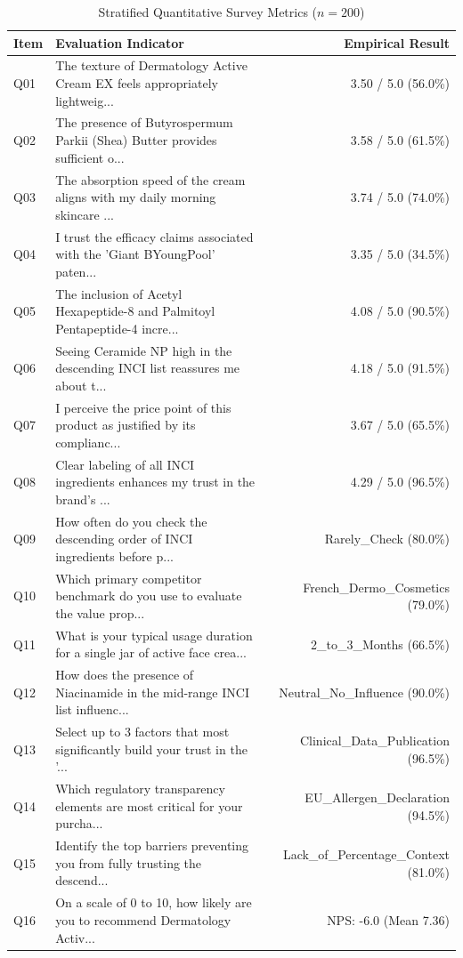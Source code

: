 \documentclass[10pt,twocolumn,a4paper]{article}
\begin{document}
\begin{table}[t]
\centering
\caption{Stratified Quantitative Survey Metrics ($n = 200$)}
\label{tab:metrics}
\small
\begin{tabularx}{\textwidth}{l X r}
\toprule
\textbf{Item} & \textbf{Evaluation Indicator} & \textbf{Empirical Result} \\
\midrule
Q01 & The texture of Dermatology Active Cream EX feels appropriately lightweig... & 3.50 / 5.0 (56.0\%) \\
Q02 & The presence of Butyrospermum Parkii (Shea) Butter provides sufficient o... & 3.58 / 5.0 (61.5\%) \\
Q03 & The absorption speed of the cream aligns with my daily morning skincare ... & 3.74 / 5.0 (74.0\%) \\
Q04 & I trust the efficacy claims associated with the 'Giant BYoungPool' paten... & 3.35 / 5.0 (34.5\%) \\
Q05 & The inclusion of Acetyl Hexapeptide-8 and Palmitoyl Pentapeptide-4 incre... & 4.08 / 5.0 (90.5\%) \\
Q06 & Seeing Ceramide NP high in the descending INCI list reassures me about t... & 4.18 / 5.0 (91.5\%) \\
Q07 & I perceive the price point of this product as justified by its complianc... & 3.67 / 5.0 (65.5\%) \\
Q08 & Clear labeling of all INCI ingredients enhances my trust in the brand's ... & 4.29 / 5.0 (96.5\%) \\
Q09 & How often do you check the descending order of INCI ingredients before p... & Rarely\_Check (80.0\%) \\
Q10 & Which primary competitor benchmark do you use to evaluate the value prop... & French\_Dermo\_Cosmetics (79.0\%) \\
Q11 & What is your typical usage duration for a single jar of active face crea... & 2\_to\_3\_Months (66.5\%) \\
Q12 & How does the presence of Niacinamide in the mid-range INCI list influenc... & Neutral\_No\_Influence (90.0\%) \\
Q13 & Select up to 3 factors that most significantly build your trust in the '... & Clinical\_Data\_Publication (96.5\%) \\
Q14 & Which regulatory transparency elements are most critical for your purcha... & EU\_Allergen\_Declaration (94.5\%) \\
Q15 & Identify the top barriers preventing you from fully trusting the descend... & Lack\_of\_Percentage\_Context (81.0\%) \\
Q16 & On a scale of 0 to 10, how likely are you to recommend Dermatology Activ... & NPS: -6.0 (Mean 7.36) \\
\bottomrule
\end{tabularx}
\end{table}
\end{document}
